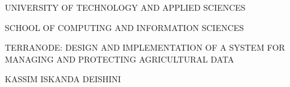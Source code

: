 \documentclass[12pt,a4paper]{report}
\begin{document}
\thispagestyle{empty}
\begin{center}
    \vspace*{1.5cm}
    
    {\fontsize{12pt}{18pt}\selectfont UNIVERSITY OF TECHNOLOGY AND APPLIED SCIENCES\par}
    
    \vspace{0.3cm}
    
    {\fontsize{12pt}{18pt}\selectfont SCHOOL OF COMPUTING AND INFORMATION SCIENCES\par}
    
    \vspace{4.0cm}
    
    {\fontsize{12pt}{18pt}\selectfont TERRANODE: DESIGN AND IMPLEMENTATION OF A SYSTEM FOR\\ MANAGING AND PROTECTING AGRICULTURAL DATA\par}
    
    \vspace{5.5cm}
    
    {\fontsize{12pt}{18pt}\selectfont KASSIM ISKANDA DEISHINI\par}
    
    \vspace{5.5cm}
    
    {\fontsize{12pt}{18pt}\par}
\end{center}
\newpage
\end{document}

